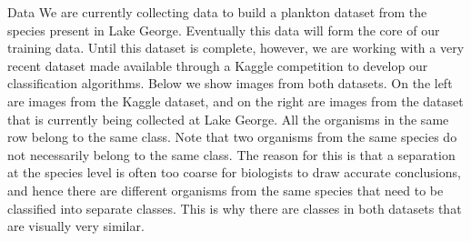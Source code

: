 \documentclass[final,hyperref={pdfpagelabels=false}]{beamer}
\begin{document}
\begin{frame}
\begin{columns}[T]
\begin{column}{.32\textwidth}
      \begin{block}{Data}
        We are currently collecting data to build a plankton dataset from the species present in Lake George.  Eventually this data
        will form the core of our training data.  Until this dataset is complete, however, we are working with a very recent dataset
        made available through a Kaggle competition to develop our classification algorithms.  Below we show images from both datasets.
        On the left are images from the Kaggle dataset, and on the right are images from the dataset that is currently being collected
        at Lake George.  All the organisms in the same row belong to the same class.  Note that two organisms from the same species
        do not necessarily belong to the same class.  The reason for this is that a separation at the species level is often too coarse
        for biologists to draw accurate conclusions, and hence there are different organisms from the same species that need to be
        classified into separate classes.  This is why there are classes in both datasets that are visually very similar.
        \begin{figure}
          \begin{minipage}{.5\textwidth}
            \centering




\end{minipage}
\end{figure}
\end{block}
\end{column}
\end{columns}
\end{frame}
\end{document}
